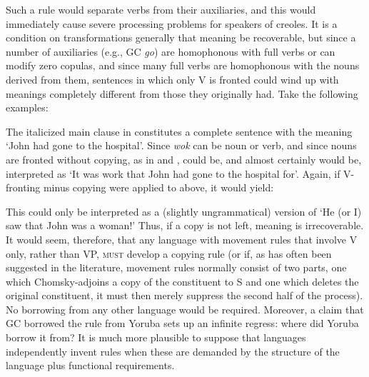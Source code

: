 Such a rule would separate verbs from their auxiliaries, and this would immediately cause severe processing problems for speakers of creoles. It is a condition on transformations generally that meaning be recoverable, but since a number of auxiliaries (e.g., GC \textit{go}) are homoph\-onous with full verbs or can modify zero copulas, and since many full verbs are homophonous with the nouns derived from them, sentences in which only V is fronted could wind up with meanings completely different from those they originally had. Take the following examples:


\z

\label{ex:2:11}\z
The italicized main clause in  constitutes a complete sentence with the meaning `John had gone to the hospital'. Since \textit{wok} can be noun or verb, and since nouns are fronted without copying, as in  and ,  could be, and almost certainly would be, interpreted as `It was work that John had gone to the hospital for'. Again, if V-fronting minus copying were applied to  above, it would yield:

\label{ex:2:12}\z
This could only be interpreted as a (slightly ungrammatical) version of `He (or I) saw that John was a woman!' Thus, if a copy is not left, meaning is irrecoverable. It would seem, therefore, that any language with movement rules that involve V only, rather than VP, \textsc{must} de\-velop a copying rule (or if, as has often been suggested in the literature, movement rules normally consist of two parts, one which Chomsky-adjoins a copy of the constituent to S and one which deletes the original constituent, it must then merely suppress the second half of the process). No borrowing from any other language would be required. Moreover, a claim that GC borrowed the rule from Yoruba sets up an infinite regress: where did Yoruba borrow it from? It is much more plausible to suppose that languages independently invent rules when these are demanded by the structure of the language plus func\-tional requirements.

